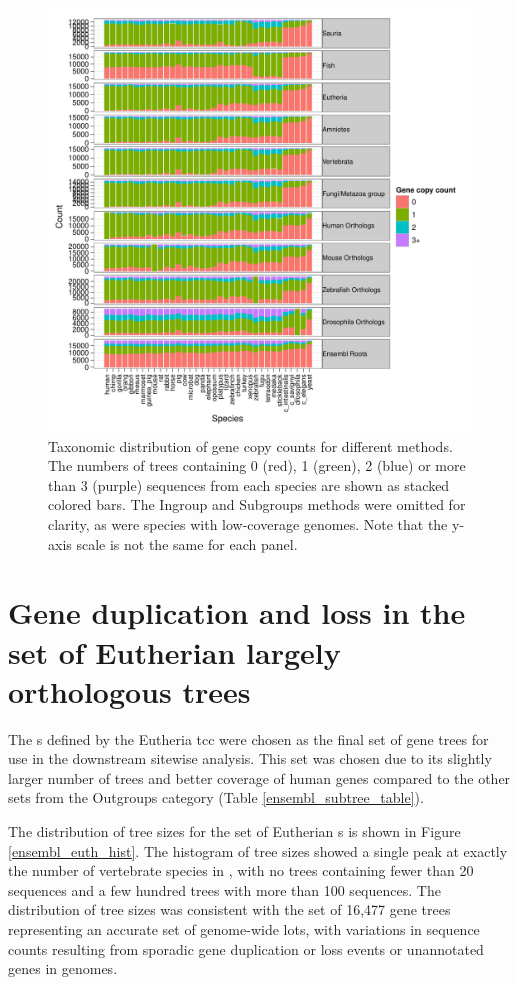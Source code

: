 \begin{figure}
\centering
\includegraphics[scale=0.8]{Figs/ortholog_stacked_bar.pdf}
\caption{Taxonomic distribution of gene copy counts for different
  \subtr methods. The numbers of trees containing 0 (red), 1 (green),
  2 (blue) or more than 3 (purple) sequences from each species are
  shown as stacked colored bars. The Ingroup and Subgroups methods
  were omitted for clarity, as were species with low-coverage
  genomes. Note that the y-axis scale is not the same for each panel.}
\label{ortholog_stacked_bar}
\end{figure}

\section{Gene duplication and loss in the set of Eutherian largely orthologous trees}

The \subtr{}s defined by the Eutheria \ac{tcc} were chosen as the
final set of gene trees for use in the downstream sitewise
analysis. This set was chosen due to its slightly larger number of
trees and better coverage of human genes compared to the other \subtr
sets from the Outgroups category (Table \ref{ensembl_subtree_table}).

The distribution of tree sizes for the set of Eutherian \subtr{}s is
shown in Figure \ref{ensembl_euth_hist}. The histogram of tree sizes
showed a single peak at exactly the number of vertebrate species in
\ens, with no trees containing fewer than 20 sequences and a few
hundred trees with more than 100 sequences. The distribution of tree
sizes was consistent with the set of 16,477 gene trees representing an
accurate set of genome-wide \mammln \acp{lot}, with variations in
sequence counts resulting from sporadic gene duplication or loss
events or unannotated genes in \lcv genomes.

